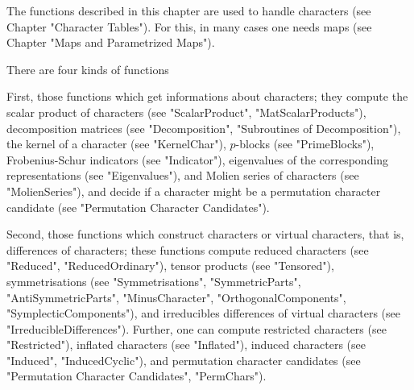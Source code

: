 
The functions  described in this  chapter  are used to handle  characters
(see Chapter "Character Tables"). For this,  in many cases one needs maps
(see Chapter "Maps and Parametrized Maps").

There are four kinds of functions\:

First, those functions  which  get  informations about  characters;  they
compute  the   scalar  product  of   characters   (see   "ScalarProduct",
"MatScalarProducts"), decomposition matrices    (see     "Decomposition",
"Subroutines  of  Decomposition"),   the kernel    of   a character  (see
"KernelChar"), $p$-blocks (see "PrimeBlocks"), Frobenius-Schur indicators
(see "Indicator"), eigenvalues  of the corresponding representations (see
"Eigenvalues"), and Molien series of characters (see "MolienSeries"), and
decide if a  character might  be a  permutation character candidate  (see
"Permutation Character Candidates").

Second, those functions which construct characters or virtual characters,
that   is, differences  of   characters; these functions compute  reduced
characters (see   "Reduced",  "ReducedOrdinary"),  tensor  products  (see
"Tensored"), symmetrisations  (see   "Symmetrisations", "SymmetricParts",
"AntiSymmetricParts",        "MinusCharacter",    "OrthogonalComponents",
"SymplecticComponents"), and    irreducibles   differences   of   virtual
characters (see   "IrreducibleDifferences").   Further,  one can  compute
restricted    characters  (see "Restricted"),   inflated characters  (see
"Inflated"),  induced   characters (see "Induced",  "InducedCyclic"), and
permutation character candidates (see "Permutation Character Candidates",
"PermChars").

